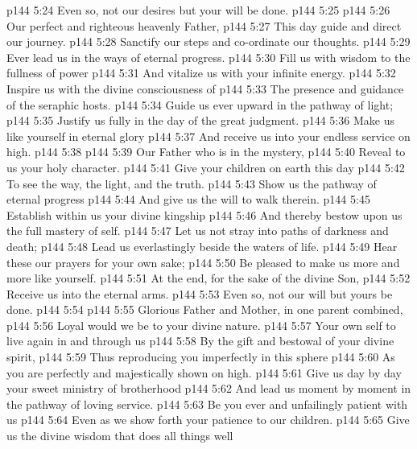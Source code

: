 \vs p144 5:24 Even so, not our desires but your will be done.
\vs p144 5:25 \separatorshort
\vs p144 5:26 Our perfect and righteous heavenly Father,
\vs p144 5:27 \hsetoff This day guide and direct our journey.
\vs p144 5:28 Sanctify our steps and co\hyp{}ordinate our thoughts.
\vs p144 5:29 \hsetoff Ever lead us in the ways of eternal progress.
\vs p144 5:30 Fill us with wisdom to the fullness of power
\vs p144 5:31 \hsetoff And vitalize us with your infinite energy.
\vs p144 5:32 Inspire us with the divine consciousness of
\vs p144 5:33 \hsetoff The presence and guidance of the seraphic hosts.
\vs p144 5:34 Guide us ever upward in the pathway of light;
\vs p144 5:35 \hsetoff Justify us fully in the day of the great judgment.
\vs p144 5:36 Make us like yourself in eternal glory
\vs p144 5:37 \hsetoff And receive us into your endless service on high.
\vs p144 5:38 \separatorshort
\vs p144 5:39 Our Father who is in the mystery,
\vs p144 5:40 \hsetoff Reveal to us your holy character.
\vs p144 5:41 Give your children on earth this day
\vs p144 5:42 \hsetoff To see the way, the light, and the truth.
\vs p144 5:43 Show us the pathway of eternal progress
\vs p144 5:44 \hsetoff And give us the will to walk therein.
\vs p144 5:45 Establish within us your divine kingship
\vs p144 5:46 \hsetoff And thereby bestow upon us the full mastery of self.
\vs p144 5:47 Let us not stray into paths of darkness and death;
\vs p144 5:48 \hsetoff Lead us everlastingly beside the waters of life.
\vs p144 5:49 Hear these our prayers for your own sake;
\vs p144 5:50 \hsetoff Be pleased to make us more and more like yourself.
\vs p144 5:51 At the end, for the sake of the divine Son,
\vs p144 5:52 \hsetoff Receive us into the eternal arms.
\vs p144 5:53 Even so, not our will but yours be done.
\vs p144 5:54 \separatorshort
\vs p144 5:55 Glorious Father and Mother, in one parent combined,
\vs p144 5:56 \hsetoff Loyal would we be to your divine nature.
\vs p144 5:57 Your own self to live again in and through us
\vs p144 5:58 \hsetoff By the gift and bestowal of your divine spirit,
\vs p144 5:59 Thus reproducing you imperfectly in this sphere
\vs p144 5:60 \hsetoff As you are perfectly and majestically shown on high.
\vs p144 5:61 Give us day by day your sweet ministry of brotherhood
\vs p144 5:62 \hsetoff And lead us moment by moment in the pathway of loving service.
\vs p144 5:63 Be you ever and unfailingly patient with us
\vs p144 5:64 \hsetoff Even as we show forth your patience to our children.
\vs p144 5:65 Give us the divine wisdom that does all things well

